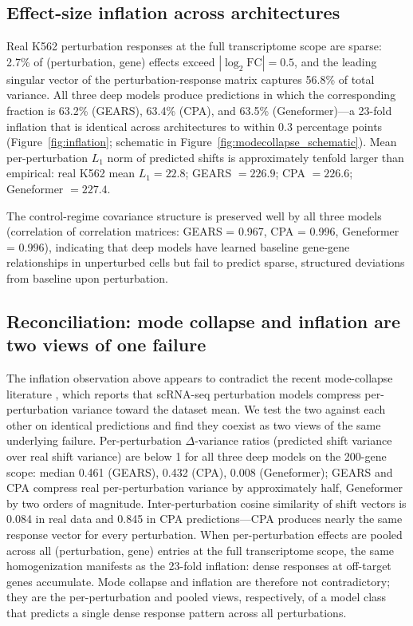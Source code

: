 \documentclass{article}
\theoremstyle{plain}
\theoremstyle{definition}
\theoremstyle{remark}
\begin{document}
\subsection{Effect-size inflation across architectures}
Real K562 perturbation responses at the full transcriptome scope are sparse: 2.7\% of (perturbation, gene) effects exceed $|\log_2 \mathrm{FC}| = 0.5$, and the leading singular vector of the perturbation-response matrix captures 56.8\% of total variance. All three deep models produce predictions in which the corresponding fraction is 63.2\% (GEARS), 63.4\% (CPA), and 63.5\% (Geneformer)---a 23-fold inflation that is identical across architectures to within 0.3 percentage points (Figure~\ref{fig:inflation}; schematic in Figure~\ref{fig:modecollapse_schematic}). Mean per-perturbation $L_1$ norm of predicted shifts is approximately tenfold larger than empirical: real K562 mean $L_1 = 22.8$; GEARS $= 226.9$; CPA $= 226.6$; Geneformer $= 227.4$.

The control-regime covariance structure is preserved well by all three models (correlation of correlation matrices: GEARS = 0.967, CPA = 0.996, Geneformer = 0.996), indicating that deep models have learned baseline gene-gene relationships in unperturbed cells but fail to predict sparse, structured deviations from baseline upon perturbation.

\subsection{Reconciliation: mode collapse and inflation are two views of one failure}
\label{sec:reconciliation}
The inflation observation above appears to contradict the recent mode-collapse literature \citep{mejia2025diversity,ahlmanneltze2025}, which reports that scRNA-seq perturbation models compress per-perturbation variance toward the dataset mean. We test the two against each other on identical predictions and find they coexist as two views of the same underlying failure. Per-perturbation $\Delta$-variance ratios (predicted shift variance over real shift variance) are below 1 for all three deep models on the 200-gene scope: median 0.461 (GEARS), 0.432 (CPA), 0.008 (Geneformer); GEARS and CPA compress real per-perturbation variance by approximately half, Geneformer by two orders of magnitude. Inter-perturbation cosine similarity of shift vectors is 0.084 in real data and 0.845 in CPA predictions---CPA produces nearly the same response vector for every perturbation. When per-perturbation effects are pooled across all (perturbation, gene) entries at the full transcriptome scope, the same homogenization manifests as the 23-fold inflation: dense responses at off-target genes accumulate. Mode collapse and inflation are therefore not contradictory; they are the per-perturbation and pooled views, respectively, of a model class that predicts a single dense response pattern across all perturbations.
\end{document}
